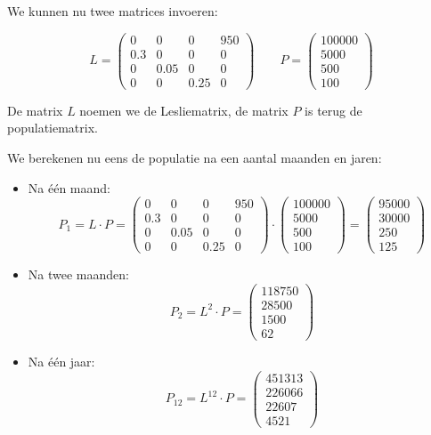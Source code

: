\documentclass[12pt,twoside]{article}
\begin{document}
We kunnen nu twee matrices invoeren:

\[
  L=\begin{pmatrix}
    0 & 0 & 0 & 950 \\
    0.3 & 0 & 0 & 0 \\
    0 & 0.05 & 0 & 0 \\
    0 & 0 & 0.25 & 0
  \end{pmatrix}\qquad
  P=\begin{pmatrix}100000\\5000\\500\\100\end{pmatrix}
\]

De matrix $L$ noemen we de Lesliematrix, de matrix $P$ is terug de populatiematrix.

We berekenen nu eens de populatie na een aantal maanden en jaren:


\begin{itemize}
\item Na één maand:
  \[P_1 = L \cdot P =
    \begin{pmatrix}
      0 & 0 & 0 & 950 \\
      0.3 & 0 & 0 & 0 \\
      0 & 0.05 & 0 & 0 \\
      0 & 0 & 0.25 & 0
    \end{pmatrix}
    \cdot
    \begin{pmatrix}100000\\5000\\500\\100\end{pmatrix}
    =
    \begin{pmatrix}95000\\30000\\250\\125\end{pmatrix}\]
\item Na twee maanden:
  \[P_2 = L^2 \cdot P = \begin{pmatrix}118750\\28500\\1500\\62\end{pmatrix}\]
\item Na één jaar:
  \[P_{12} = L^{12} \cdot P = \begin{pmatrix}451313\\226066\\22607\\4521\end{pmatrix}\]
\end{itemize}
\end{document}
